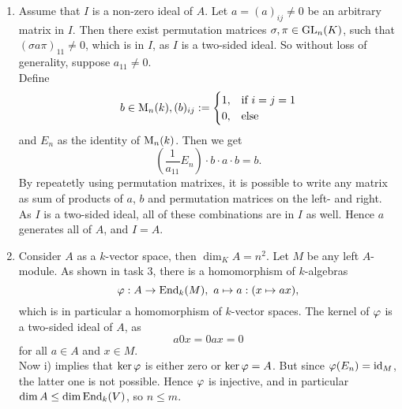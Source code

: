 \begin{sol}
  \begin{enumerate}
    \item Assume that $I$ is a non-zero ideal of $A$. Let $a=(a)_{ij}\neq 0$ be an arbitrary matrix in $I$. Then there exist permutation matrices $\sigma, \pi \in \operatorname{GL}_n(K)$, such that $(\sigma a \pi)_{11}\neq 0$, which is in $I$, as $I$ is a two-sided ideal. So without loss of generality, suppose $a_{11}\neq 0$.\\
    Define
    \[
    b\in \operatorname{M}_n(k),(b)_{ij}:= \begin{cases} 1,&\text{if }i=j=1\\0,&\text{else}\\\end{cases}
    \]
    and $E_n$ as the identity of $\operatorname{M}_n(k)$. Then we get
    \[
    \left(\frac{1}{a_{11}} E_n\right)\cdot b \cdot a\cdot b = b.\]
    By repeatetly using permutation matrixes, it is possible to write any matrix as sum of products of $a$, $b$ and permutation matrices on the left- and right. As $I$ is a two-sided ideal, all of these combinations are in $I$ as well. Hence $a$ generates all of $A$, and $I=A$.
    \item Consider $A$ as a $k$-vector space, then $\dim_KA=n^2$. Let $M$ be any left $A$-module. As shown in task 3, there is a homomorphism of $k$-algebras
    \[
    \varphi: A\to \operatorname{End}_k(M),~a\mapsto a:(x\mapsto ax),
    \]
    which is in particular a homomorphism of $k$-vector spaces. The kernel of $\varphi$ is a two-sided ideal of $A$, as
    \[
    a0x=0ax=0\]
    for all $a\in A$ and $x\in M$.\\
    Now i) implies that $\ker \varphi$ is either zero or $\ker \varphi = A$. But since $\varphi(E_n)=\operatorname{id}_{M}$, the latter one is not possible. Hence $\varphi$ is injective, and in particular $\dim A\leq \dim \operatorname{End}_k(V)$, so $n\leq m$.
  \end{enumerate}
\end{sol}
